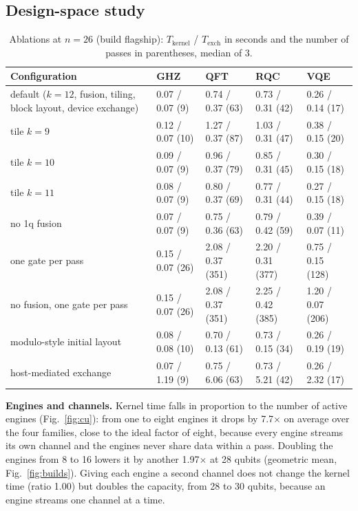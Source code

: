 \documentclass[pdflatex,sn-mathphys-num]{sn-jnl}
\newcommand{\NumAblSource}{flagship}
\newcommand{\NumBuildEightToSixteen}{1.97}
\newcommand{\NumBuildSixteenMaxN}{28}
\newcommand{\NumBuildSixteenToWide}{1.00}
\newcommand{\NumBuildWideMaxN}{30}
\newcommand{\NumCuScaleOneToEight}{7.7}
\theoremstyle{thmstyleone}
\theoremstyle{thmstylethree}
\begin{document}
\subsection{Design-space study}\label{subsec:res-ablation}

\begin{table}
\centering
\caption{Ablations at $n=26$ (build \NumAblSource): $T_\mathrm{kernel}$ / $T_\mathrm{exch}$ in seconds and the number of passes in parentheses, median of 3.}\label{tab:ablation}
\footnotesize\setlength{\tabcolsep}{3pt}
\begin{tabular}{p{3.6cm}llll}
\toprule
Configuration & GHZ & QFT & RQC & VQE \\
\midrule
default ($k=12$, fusion, tiling, block layout, device exchange) & 0.07 / 0.07 (9) & 0.74 / 0.37 (63) & 0.73 / 0.31 (42) & 0.26 / 0.14 (17) \\
tile $k=9$ & 0.12 / 0.07 (10) & 1.27 / 0.37 (87) & 1.03 / 0.31 (47) & 0.38 / 0.15 (20) \\
tile $k=10$ & 0.09 / 0.07 (9) & 0.96 / 0.37 (79) & 0.85 / 0.31 (45) & 0.30 / 0.15 (18) \\
tile $k=11$ & 0.08 / 0.07 (9) & 0.80 / 0.37 (69) & 0.77 / 0.31 (44) & 0.27 / 0.15 (18) \\
no 1q fusion & 0.07 / 0.07 (9) & 0.75 / 0.36 (63) & 0.79 / 0.42 (59) & 0.39 / 0.07 (11) \\
one gate per pass & 0.15 / 0.07 (26) & 2.08 / 0.37 (351) & 2.20 / 0.31 (377) & 0.75 / 0.15 (128) \\
no fusion, one gate per pass & 0.15 / 0.07 (26) & 2.08 / 0.37 (351) & 2.25 / 0.42 (385) & 1.20 / 0.07 (206) \\
modulo-style initial layout & 0.08 / 0.08 (10) & 0.70 / 0.13 (61) & 0.73 / 0.15 (34) & 0.26 / 0.19 (19) \\
host-mediated exchange & 0.07 / 1.19 (9) & 0.75 / 6.06 (63) & 0.73 / 5.21 (42) & 0.26 / 2.32 (17) \\
\bottomrule
\end{tabular}
\end{table}

\textbf{Engines and channels.} Kernel time falls in proportion to the number of active engines (Fig.~\ref{fig:cu}): from one to eight engines it drops by \NumCuScaleOneToEight$\times$ on average over the four families, close to the ideal factor of eight, because every engine streams its own channel and the engines never share data within a pass. Doubling the engines from 8 to 16 lowers it by another \NumBuildEightToSixteen$\times$ at 28 qubits (geometric mean, Fig.~\ref{fig:builds}). Giving each engine a second channel does not change the kernel time (ratio \NumBuildSixteenToWide) but doubles the capacity, from \NumBuildSixteenMaxN{} to \NumBuildWideMaxN{} qubits, because an engine streams one channel at a time.
\end{document}
